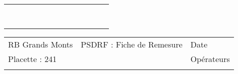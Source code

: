 \documentclass[a4paper, landscape]{article}\usepackage[]{graphicx}\usepackage[]{color}
\begin{document}
{\begin{tabular}{|p{1cm}|p{2cm}|p{1.6cm}|p{1.6cm}|p{1.6cm}|p{1.6cm}|p{1.5cm}|p{1.5cm}|p{1.5cm}|p{1.5cm}|p{1.5cm}|p{7.5cm}|p{5cm}|}
   \rowcolor[gray]{0.95} \hline
 &  &  &  &  &  &  &  &  &  &  &  &  \\ 
   \hline
 &  &  &  &  &  &  &  &  &  &  &  &  \\ 
   \rowcolor[gray]{0.95} \hline
 &  &  &  &  &  &  &  &  &  &  &  &  \\ 
   \hline
 &  &  &  &  &  &  &  &  &  &  &  &  \\ 
   \rowcolor[gray]{0.95} \hline
 &  &  &  &  &  &  &  &  &  &  &  &  \\ 
   \hline
 &  &  &  &  &  &  &  &  &  &  &  &  \\ 
   \rowcolor[gray]{0.95} \hline
 &  &  &  &  &  &  &  &  &  &  &  &  \\ 
   \hline
 &  &  &  &  &  &  &  &  &  &  &  &  \\ 
   \rowcolor[gray]{0.95} \hline
 &  &  &  &  &  &  &  &  &  &  &  &  \\ 
   \hline
\end{tabular}
}

\begin{tabular}{p{10cm}p{10cm}p{8cm}}
  RB Grands Monts & PSDRF : Fiche de Remesure & Date \\ 
  Placette : 241 &  & Opérateurs \\ 
   &  &  \\ 
  \end{tabular}
\end{document}
